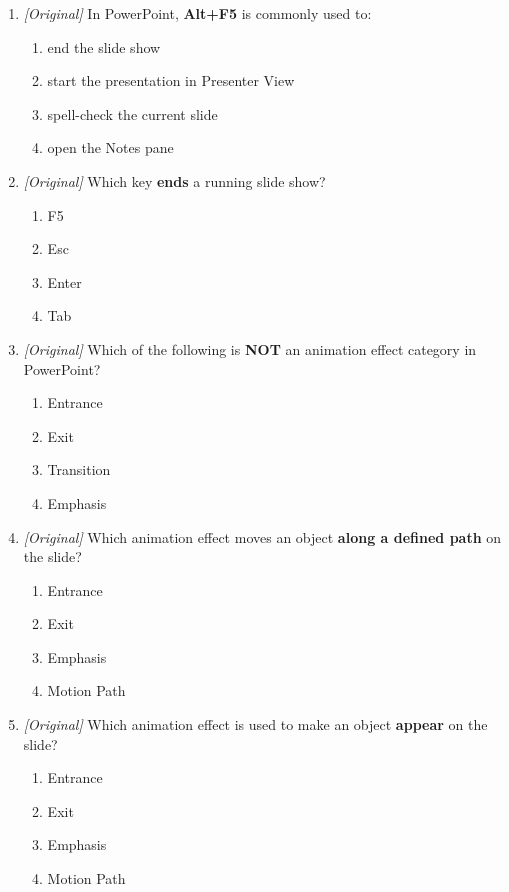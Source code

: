 \documentclass[11pt]{article}
\begin{document}
\begin{enumerate}[label=\textbf{Q\arabic*.}, leftmargin=*]
\begin{enumerate}[label=\Alph*.]
  \end{enumerate}
\item \textit{[Original]} In PowerPoint, \textbf{Alt+F5} is commonly used to:
  \begin{enumerate}[label=\Alph*.]
    \item end the slide show
    \item start the presentation in Presenter View
    \item spell-check the current slide
    \item open the Notes pane
  \end{enumerate}
\item \textit{[Original]} Which key \textbf{ends} a running slide show?
  \begin{enumerate}[label=\Alph*.]
    \item F5
    \item Esc
    \item Enter
    \item Tab
  \end{enumerate}
\item \textit{[Original]} Which of the following is \textbf{NOT} an animation
  effect category in PowerPoint?
  \begin{enumerate}[label=\Alph*.]
    \item Entrance
    \item Exit
    \item Transition
    \item Emphasis
  \end{enumerate}
\item \textit{[Original]} Which animation effect moves an object \textbf{along a
  defined path} on the slide?
  \begin{enumerate}[label=\Alph*.]
    \item Entrance
    \item Exit
    \item Emphasis
    \item Motion Path
  \end{enumerate}
\item \textit{[Original]} Which animation effect is used to make an object
  \textbf{appear} on the slide?
  \begin{enumerate}[label=\Alph*.]
    \item Entrance
    \item Exit
    \item Emphasis
    \item Motion Path
  \end{enumerate}

\end{enumerate}
\end{document}
